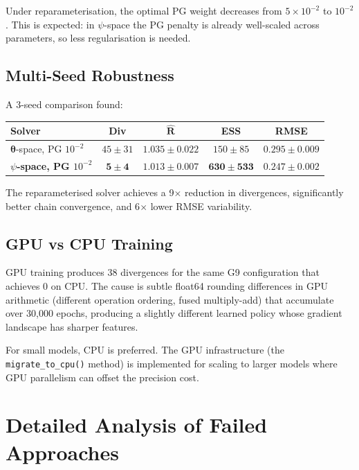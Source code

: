 \documentclass[11pt,a4paper]{article}
\theoremstyle{definition}
\newcommand{\btheta}{\boldsymbol{\theta}}
\newcommand{\code}[1]{\texttt{\color{codecolor}#1}}
\begin{document}
	Under reparameterisation, the optimal PG weight decreases from $5 \times 10^{-2}$ to $10^{-2}$.
	This is expected: in $\psi$-space the PG penalty is already well-scaled across parameters, so less regularisation is needed.
	
	\subsection{Multi-Seed Robustness}
	
	A 3-seed comparison found:
	
	\begin{center}
		\begin{tabular}{lcccc}
			\toprule
			\textbf{Solver} & \textbf{Div} & $\hat{\mathbf{R}}$ & \textbf{ESS} & \textbf{RMSE} \\
			\midrule
			$\btheta$-space, PG $10^{-2}$ & $45 \pm 31$ & $1.035 \pm 0.022$ & $150 \pm 85$ & $0.295 \pm 0.009$ \\
			\rowcolor{green!10}
			\textbf{$\psi$-space, PG $10^{-2}$} & $\mathbf{5 \pm 4}$ & $\mathbf{1.013 \pm 0.007}$ & $\mathbf{630 \pm 533}$ & $\mathbf{0.247 \pm 0.002}$ \\
			\bottomrule
		\end{tabular}
	\end{center}
	
	The reparameterised solver achieves a 9$\times$ reduction in divergences, significantly better chain convergence, and 6$\times$ lower RMSE variability.
	
	\subsection{GPU vs CPU Training}
	
	GPU training produces 38 divergences for the same G9 configuration that achieves 0 on CPU.
	The cause is subtle float64 rounding differences in GPU arithmetic (different operation ordering, fused multiply-add) that accumulate over 30{,}000 epochs, producing a slightly different learned policy whose gradient landscape has sharper features.
	
	For small models, CPU is preferred.
	The GPU infrastructure (the \code{migrate\_to\_cpu()} method) is implemented for scaling to larger models where GPU parallelism can offset the precision cost.
	
	
	\section{Detailed Analysis of Failed Approaches}
	\label{sec:failed}
	
\end{document}
